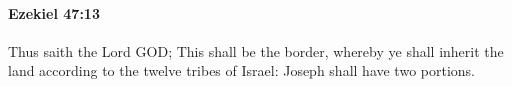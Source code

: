 
		\paragraph{Ezekiel 47:13} %
			\label{EZEKIEL-47-13}

			Thus saith the Lord GOD; This shall be the border, whereby ye shall inherit the land according to the twelve tribes of Israel: Joseph shall have two portions.


